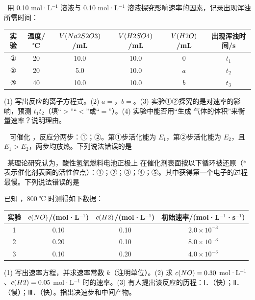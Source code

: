 \begin{xiti}
\item {}\ 用 0.10 mol·L$^{-1}$  溶液与 0.10 mol·L$^{-1}$  溶液探究影响速率的因素，记录出现浑浊所需时间：
\begin{center}\small
\begin{tabular}{cccccc}
\toprule
实验 & 温度/℃ & $V(Na2S2O3)$/mL & $V(H2SO4)$/mL & $V(H2O)$/mL & 出现浑浊时间/s \\
\midrule
① & 20 & 10.0 & 10.0 & 0 & $t_1$ \\
② & 20 & 5.0 & 10.0 & $a$ & $t_2$ \\
③ & 40 & 10.0 & 10.0 & $b$ & $t_3$ \\
\bottomrule
\end{tabular}
\end{center}
(1) 写出反应的离子方程式。(2) $a=$\tk，$b=$\tk。(3) 实验①②探究的是\tk{}对速率的影响，预测 $t_1$\tk$t_2$（填“$>$”“$<$”或“$=$”）。(4) 实验中能否用“生成  气体的体积”来衡量速率？说明理由。

\item {}\  可催化 ，反应分两步：①；②。第①步活化能为 $E_1$，第②步活化能为 $E_2$，且 $E_1>E_2$，两步均放热。下列说法错误的是\xz
{}

\item {}\ 某理论研究认为，酸性氢氧燃料电池正极上  在催化剂表面按以下循环被还原（* 表示催化剂表面的活性位点）：①；②；③；④；⑤。其中获得第一个电子的过程最慢。下列说法错误的是\xz
{}

\item 已知 ，800 ℃ 时测得如下数据：
\begin{center}\small
\begin{tabular}{cccc}
\toprule
实验 & $c(NO)$/(mol·L$^{-1}$) & $c(H2)$/(mol·L$^{-1}$) & 初始速率/(mol·L$^{-1}$·s$^{-1}$) \\
\midrule
1 & 0.10 & 0.10 & $2.0\times10^{-3}$ \\
2 & 0.20 & 0.10 & $8.0\times10^{-3}$ \\
3 & 0.10 & 0.20 & $4.0\times10^{-3}$ \\
\bottomrule
\end{tabular}
\end{center}
(1) 写出速率方程，并求速率常数 $k$（注明单位）。(2) 求 $c(NO)=0.30$ mol·L$^{-1}$、$c(H2)=0.05$ mol·L$^{-1}$ 时的速率。(3) 有人提出该反应的历程：Ⅰ．（快）；Ⅱ．（慢）；Ⅲ．（快）。指出决速步和中间产物。


\end{xiti}

